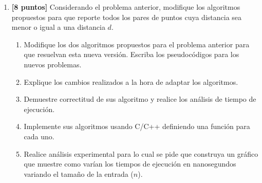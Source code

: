 \documentclass[10pt]{article}
\newcommand{\N}{\mathbb{N}}
\begin{document}
\begin{enumerate}
\item \textbf{[8 puntos]} Considerando el problema anterior, modifique los algoritmos propuestos para que reporte todos los pares de puntos cuya distancia sea menor o igual a una distancia $d$.

\begin{enumerate}
    \item Modifique los dos algoritmos propuestos para el problema anterior para que resuelvan esta nueva versión. Escriba los pseudocódigos para los nuevos problemas.
    \item Explique los cambios realizados a la hora de adaptar los algoritmos.
    \item Demuestre correctitud de sus algoritmo y realice los análisis de tiempo de ejecución.
    \item Implemente sus algoritmos usando C/C++ definiendo una función para cada uno.
    \item Realice análisis experimental para lo cual se pide que construya un gráfico que muestre como varían los tiempos de ejecución en nanosegundos variando el tamaño de la entrada ($n$).
\end{enumerate}








\end{enumerate}
\end{document}
